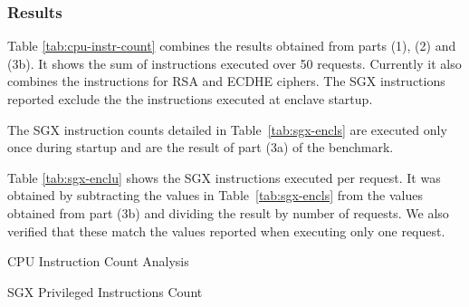 \documentclass[../../../main.tex]{subfiles}
\begin{document}
\subsubsection*{Results}
Table \ref{tab:cpu-instr-count} combines the results obtained from parts (1),
(2) and (3b). It shows the sum of instructions executed over 50 requests.
Currently it also combines the instructions for RSA and ECDHE ciphers. The SGX
instructions reported exclude the the instructions executed at enclave startup.

The SGX instruction counts detailed in Table~\ref{tab:sgx-encls} are executed
only once during startup and are the result of part (3a) of the benchmark.

Table \ref{tab:sgx-enclu} shows the SGX instructions executed per request. It
was obtained by subtracting the values in Table~\ref{tab:sgx-encls} from the
values obtained from part (3b) and dividing the result by number of requests.
We also verified that these match the values reported when executing only one
request.


\begin{table}[H]
  \caption{CPU Instruction Count Analysis}
  \label{tab:cpu-instr-count}
\end{table}

\begin{table}[H]
  \center
  \footnotesize
  \caption{SGX Privileged Instructions Count}
  \label{tab:sgx-encls}
\end{table}
\end{document}
